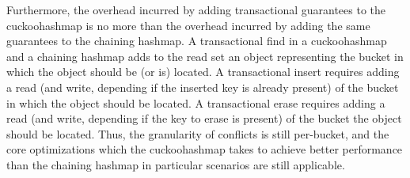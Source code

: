 Furthermore, the overhead incurred by adding transactional guarantees to the cuckoohashmap is no more than the overhead incurred by adding the same guarantees to the chaining hashmap. A transactional find in a cuckoohashmap and a chaining hashmap adds to the read set an object representing the bucket in which the object should be (or is) located.  A transactional insert requires adding a read (and write, depending if the inserted key is already present) of the bucket in which the object should be located. A transactional erase requires adding a read (and write, depending if the key to erase is present) of the bucket the object should be located. Thus, the granularity of conflicts is still per-bucket, and the core optimizations which the cuckoohashmap takes to achieve better performance than the chaining hashmap in particular scenarios are still applicable.

